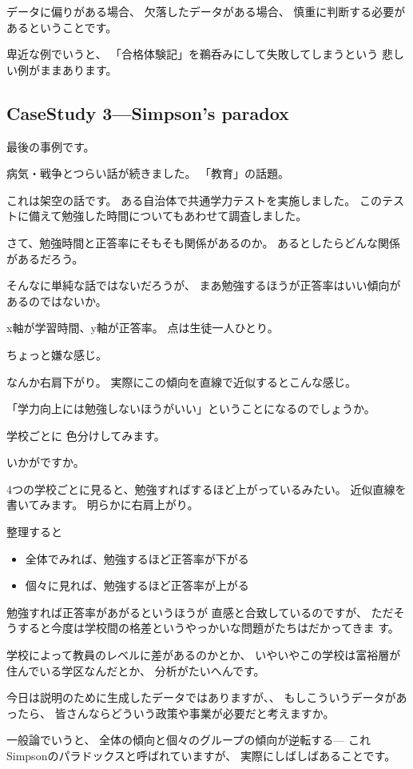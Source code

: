 \documentclass[uplatex,jis2004,dvipdfmx,12pt]{jsarticle}
\begin{document}
データに偏りがある場合、
欠落したデータがある場合、
慎重に判断する必要があるということです。

卑近な例でいうと、
「合格体験記」を鵜呑みにして失敗してしまうという
悲しい例がままあります。


\subsection{CaseStudy 3---Simpson's paradox}
最後の事例です。

病気・戦争とつらい話が続きました。
「教育」の話題。

これは架空の話です。
ある自治体で共通学力テストを実施しました。
このテストに備えて勉強した時間についてもあわせて調査しました。


さて、勉強時間と正答率にそもそも関係があるのか。
あるとしたらどんな関係があるだろう。

そんなに単純な話ではないだろうが、
まあ勉強するほうが正答率はいい傾向があるのではないか。


x軸が学習時間、y軸が正答率。
点は生徒一人ひとり。

ちょっと嫌な感じ。

なんか右肩下がり。
実際にこの傾向を直線で近似するとこんな感じ。

「学力向上には勉強しないほうがいい」ということになるのでしょうか。

学校ごとに
色分けしてみます。

いかがですか。

4つの学校ごとに見ると、勉強すればするほど上がっているみたい。
近似直線を書いてみます。
明らかに右肩上がり。

整理すると
\begin{itemize}[itemsep=5pt]
 \item 全体でみれば、勉強するほど正答率が下がる
 \item 個々に見れば、勉強するほど正答率が上がる
\end{itemize}

勉強すれば正答率があがるというほうが
直感と合致しているのですが、
ただそうすると今度は学校間の格差というやっかいな問題がたちはだかってきま
す。

学校によって教員のレベルに差があるのかとか、
いやいやこの学校は富裕層が住んでいる学区なんだとか、
分析がたいへんです。

今日は説明のために生成したデータではありますが、、
もしこういうデータがあったら、
皆さんならどういう政策や事業が必要だと考えますか。

一般論でいうと、
全体の傾向と個々のグループの傾向が逆転する---
これSimpsonのパラドックスと呼ばれていますが、
実際にしばしばあることです。
\end{document}
